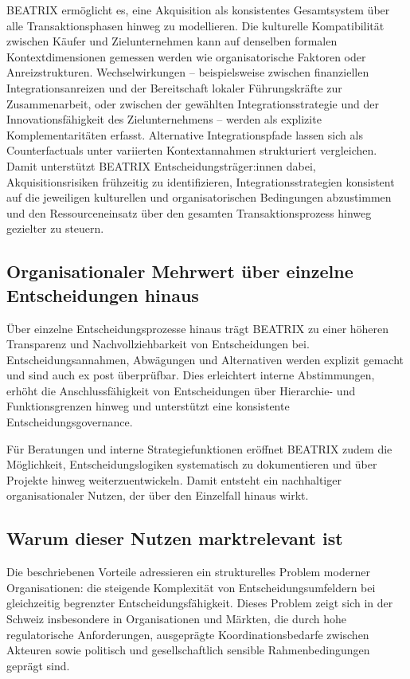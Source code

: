 \documentclass[11pt,a4paper]{article}
\begin{document}
BEATRIX ermöglicht es, eine Akquisition als konsistentes Gesamtsystem über alle Transaktionsphasen hinweg zu modellieren. Die kulturelle Kompatibilität zwischen Käufer und Zielunternehmen kann auf denselben formalen Kontextdimensionen gemessen werden wie organisatorische Faktoren oder Anreizstrukturen. Wechselwirkungen -- beispielsweise zwischen finanziellen Integrationsanreizen und der Bereitschaft lokaler Führungskräfte zur Zusammenarbeit, oder zwischen der gewählten Integrationsstrategie und der Innovationsfähigkeit des Zielunternehmens -- werden als explizite Komplementaritäten erfasst. Alternative Integrationspfade lassen sich als Counterfactuals unter variierten Kontextannahmen strukturiert vergleichen. Damit unterstützt BEATRIX Entscheidungsträger:innen dabei, Akquisitionsrisiken frühzeitig zu identifizieren, Integrationsstrategien konsistent auf die jeweiligen kulturellen und organisatorischen Bedingungen abzustimmen und den Ressourceneinsatz über den gesamten Transaktionsprozess hinweg gezielter zu steuern.

\subsection{Organisationaler Mehrwert über einzelne Entscheidungen hinaus}

Über einzelne Entscheidungsprozesse hinaus trägt BEATRIX zu einer höheren Transparenz und Nachvollziehbarkeit von Entscheidungen bei. Entscheidungsannahmen, Abwägungen und Alternativen werden explizit gemacht und sind auch ex post überprüfbar. Dies erleichtert interne Abstimmungen, erhöht die Anschlussfähigkeit von Entscheidungen über Hierarchie- und Funktionsgrenzen hinweg und unterstützt eine konsistente Entscheidungsgovernance.

Für Beratungen und interne Strategiefunktionen eröffnet BEATRIX zudem die Möglichkeit, Entscheidungslogiken systematisch zu dokumentieren und über Projekte hinweg weiterzuentwickeln. Damit entsteht ein nachhaltiger organisationaler Nutzen, der über den Einzelfall hinaus wirkt.

\subsection{Warum dieser Nutzen marktrelevant ist}

Die beschriebenen Vorteile adressieren ein strukturelles Problem moderner Organisationen: die steigende Komplexität von Entscheidungsumfeldern bei gleichzeitig begrenzter Entscheidungsfähigkeit. Dieses Problem zeigt sich in der Schweiz insbesondere in Organisationen und Märkten, die durch hohe regulatorische Anforderungen, ausgeprägte Koordinationsbedarfe zwischen Akteuren sowie politisch und gesellschaftlich sensible Rahmenbedingungen geprägt sind.
\end{document}
